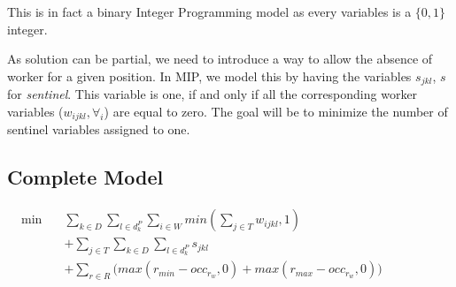 \documentclass[../../thesis.tex]{subfiles}
\begin{document}
This is in fact a binary Integer Programming model as every variables is a $\{0, 1\}$ integer.

As solution can be partial, we need to introduce a way to allow the absence of worker for a 
given position. In MIP, we model this by having the variables $s_{jkl}$, $s$ for \emph{sentinel}. This variable is one, if and only if all the 
corresponding worker variables ($w_{ijkl}, \forall_i$) are equal to zero. The goal will be to minimize 
the number of sentinel variables assigned to one.

\subsection{Complete Model}



\begingroup
\allowdisplaybreaks
\begin{subequations}
  \label{obj}
  \begin{align}
    \textrm{min} \quad & \sum_{k \in D} \sum_{l \in d^P_k} \sum_{i \in W} min(\sum_{j \in T} w_{ijkl}, 1) & \qquad & \quad \label{obj:1} \\ 
     & + \sum_{j \in T}\sum_{k\in D}\sum_{l \in d^P_k} s_{jkl}  & \qquad &  \quad \label{obj:2} \\ 
     & + \sum_{r \in R} \big( max(r_{min} - occ_{r_{w}}, 0) + max(r_{max} - occ_{r_{w}}, 0) \big)  & \qquad &  \quad \label{obj:3}
  \end{align}
\end{subequations}
\end{document}
